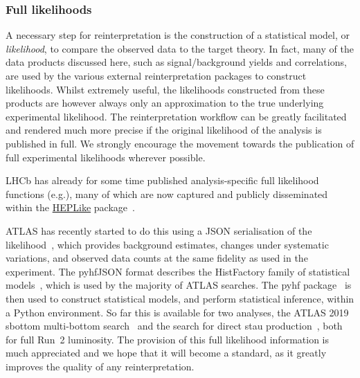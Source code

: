 \documentclass[a4paper,aps,prd,longbibliography,notitlepage,showpacs,amsmath,amssymb,superscriptaddress,nofootinbib,floatfix,11pt,preprintnumbers]{revtex4-1-mod}
\newcommand{\python}{\textsf{Python}\xspace}
\newcommand{\json}{\textsf{JSON}\xspace}
\newcommand{\pyhf}{\textsf{pyhf}\xspace}
\newcommand{\heplike}{\textsf{HEPLike}\xspace}
\newcommand{\eg}{e.g.\xspace}
\renewcommand{\emph}[1]{\textit{#1}}
\begin{document}
\subsubsection{Full likelihoods}\label{sec:likelihods}

A necessary step for reinterpretation is the construction of a statistical model, or \emph{likelihood}, to compare the observed data to the target theory. In fact, many of the data products discussed here, such as signal/background yields and correlations, are used by the various external reinterpretation packages to construct likelihoods.  Whilst extremely useful, the likelihoods constructed from these products are however always only an approximation to the true underlying experimental likelihood.  The reinterpretation workflow can be greatly facilitated and rendered much more precise if the original likelihood of the analysis is published in full.  We strongly encourage the movement towards the publication of full experimental likelihoods wherever possible.

LHCb has already for some time published analysis-specific full likelihood functions (\eg\cite{Aaij:2015oid}), many of which are now captured and publicly disseminated within the
\href{https://github.com/mchrzasz/HEPLike}{\heplike} package~\cite{Bhom:2020bfe}.

ATLAS has recently started to do this using a \json serialisation of the likelihood~\cite{ATL-PHYS-PUB-2019-029}, which provides background estimates, changes under systematic variations, and observed data counts at the same fidelity as used in the experiment.
The \pyhf \json format describes the \textsf{HistFactory} family of statistical models~\cite{Cranmer:1456844}, which is used by the majority of ATLAS searches.  The \pyhf package~\cite{pyhf} is then used to construct statistical models, and perform statistical inference, within a \python environment. So far this is available for two analyses, the ATLAS 2019 sbottom multi-bottom search~\cite{Aad:2019pfy} and the search for direct stau production~\cite{Aad:2019byo}, both for full Run~2 luminosity.
The provision of this full likelihood information is much appreciated and we hope that it
will become a standard, as it greatly improves the quality of any reinterpretation.
\end{document}

